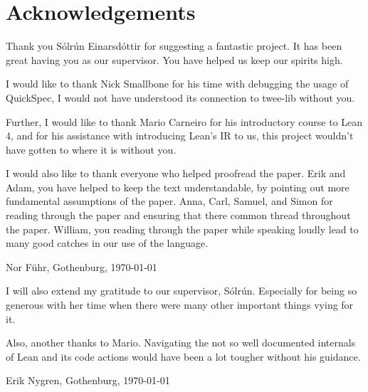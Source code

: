 \thispagestyle{plain} %
\section*{Acknowledgements}
Thank you Sólrún Einarsdóttir for suggesting a fantastic project.
It has been great having you as our supervisor.
You have helped us keep our spirits high.

I would like to thank Nick Smallbone for his time with debugging the usage of QuickSpec, I would not have understood its connection to twee-lib without you.

Further, I would like to thank Mario Carneiro for his introductory course to Lean 4, and for his assistance with introducing Lean's IR to us, this project wouldn't have gotten to where it is without you.

I would also like to thank everyone who helped proofread the paper.
Erik and Adam, you have helped to keep the text understandable, by pointing out more fundamental assumptions of the paper.
Anna, Carl, Samuel, and Simon for reading through the paper and ensuring that there common thread throughout the paper.
William, you reading through the paper while speaking loudly lead to many good catches in our use of the language.

\vspace{0.5cm}
\hfill
Nor Führ, Gothenburg, \today

\vspace{1.5cm}

I will also extend my gratitude to our supervisor, Sólrún.
Especially for being so generous with her time when there were many other important things vying for it.

Also, another thanks to Mario.
Navigating the not so well documented internals of Lean and its code actions would have been a lot tougher without his guidance.

\vspace{0.5cm}
\hfill
Erik Nygren, Gothenburg, \today

\cleardoublepage
